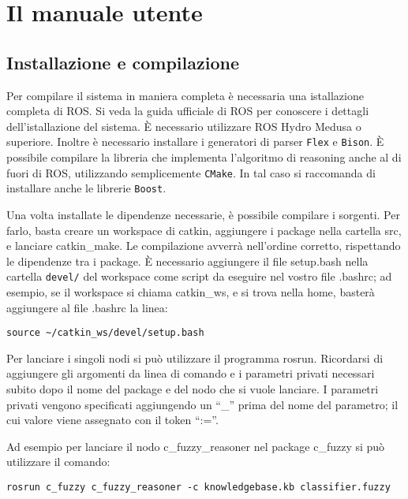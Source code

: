\chapter{Il manuale utente}
\label{app:manuale}
\thispagestyle{empty}

\section{Installazione e compilazione}

Per compilare il sistema in maniera completa è necessaria una istallazione completa di ROS. Si veda la guida ufficiale di ROS per conoscere i dettagli dell'istallazione del sistema. \`E necessario utilizzare ROS Hydro Medusa o superiore.  %
Inoltre è necessario installare i generatori di parser \verb|Flex| e \verb|Bison|.
\`E possibile compilare la libreria che implementa l'algoritmo di reasoning anche al di fuori di ROS, utilizzando semplicemente \verb|CMake|. In tal caso si raccomanda di installare anche le librerie \verb|Boost|.

Una volta installate le dipendenze necessarie, è possibile compilare i sorgenti. Per farlo, basta creare un workspace di catkin, aggiungere i package nella cartella src, e lanciare catkin\_make. Le compilazione avverrà nell'ordine corretto, rispettando le dipendenze tra i package.
\`E necessario aggiungere il file setup.bash nella cartella \verb|devel/| del workspace come script da eseguire nel vostro file .bashrc; ad esempio, se il workspace  si chiama catkin\_ws, e si trova nella home, basterà aggiungere al file .bashrc la linea:
\begin{verbatim}
source ~/catkin_ws/devel/setup.bash
\end{verbatim}

Per lanciare i singoli nodi si può utilizzare il programma rosrun. Ricordarsi di aggiungere gli argomenti da linea di comando e i parametri privati necessari subito dopo il nome del package e del nodo che si vuole lanciare. 
I parametri privati vengono specificati aggiungendo un ``\_'' prima del nome del parametro; il cui valore viene assegnato con il token ``:=''.

Ad esempio per lanciare il nodo c\_fuzzy\_reasoner nel package c\_fuzzy si può utilizzare il comando:

\begin{verbatim}
rosrun c_fuzzy c_fuzzy_reasoner -c knowledgebase.kb classifier.fuzzy
\end{verbatim}

